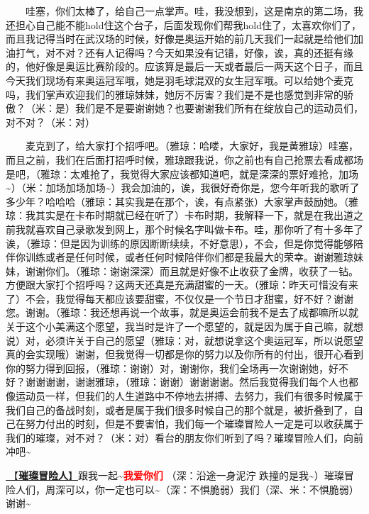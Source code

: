 \documentclass[]{ctexbook}
\begin{document}
  哇塞，你们太棒了，给自己一点掌声。哇，我没想到，这是南京的第二场，我还担心自己能不能hold住这个台子，后面发现你们帮我hold住了，太喜欢你们了，而且我记得当时在武汉场的时候，好像是奥运开始的前几天我们一起就是给他们加油打气，对不对？还有人记得吗？今天如果没有记错，好像，诶，真的还挺有缘的，他好像是奥运比赛阶段的。应该算是最后一天或者最后一两天这个日子，而且今天我们现场有来奥运冠军哦，她是羽毛球混双的女生冠军哦。可以给她个麦克吗，我们掌声欢迎我们的雅琼妹妹，她厉不厉害？我们是不是也感觉到非常的骄傲？（米：是）我们是不是要谢谢她？也要谢谢我们所有在绽放自己的运动员们，对不对？（米：对）

  麦克到了，给大家打个招呼吧。（雅琼：哈喽，大家好，我是黄雅琼）哇塞，而且之前，我们在后面打招呼时候，雅琼跟我说，你之前也有自己抢票去看成都场是吧，（雅琼：太难抢了，我觉得大家应该都知道吧，就是深深的票好难抢，加场\textasciitilde）（米：加场加场加场\textasciitilde）我会加油的，诶，我很好奇你是，您今年听我的歌听了多少年？哈哈哈（雅琼：其实我是在那个，诶，有点紧张）大家掌声鼓励她。（雅琼：我其实是在卡布时期就已经在听了）卡布时期，我解释一下，就是在我出道之前我就喜欢自己录歌发到网上，那个时候名字叫做卡布。哇，那你听了有十多年了诶，（雅琼：但是因为训练的原因断断续续，不好意思），不会，但是你觉得能够陪伴你训练或者是任何时候，或者任何时候陪伴你们都是我最大的荣幸。谢谢雅琼妹妹，谢谢你们。（雅琼：谢谢深深）而且就是好像不止收获了金牌，收获了一钻。方便跟大家打个招呼吗？这两天还真是充满甜蜜的一天。（雅琼：昨天可惜没有来了）不会，我觉得每天都应该要甜蜜，不仅仅是一个节日才甜蜜，好不好？谢谢您。谢谢。（雅琼：我还想再说一个故事，就是奥运会前我不是去了成都嘛所以就关于这个小美满这个愿望，我当时是许了一个愿望的，就是因为属于自己嘛，就想说）对，必须许关于自己的愿望（雅琼：对，就想说拿这个奥运冠军，所以说愿望真的会实现哦）谢谢，但我觉得一切都是你的努力以及你所有的付出，很开心看到你的努力得到回报，（雅琼：谢谢）对，谢谢你，我们全场再一次谢谢她，好不好？谢谢谢谢，谢谢雅琼，（雅琼：谢谢）谢谢谢谢。然后我觉得我们每个人也都像运动员一样，但我们的人生道路中不停地去拼搏、去努力，我们有很多时候属于我们自己的备战时刻，或者是属于我们很多时候自己的那个就是，被折叠到了，自己在努力付出的时刻，但是不要害怕，我们每一个璀璨冒险人一定是可以收获属于我们的璀璨，对不对？（米：对）看台的朋友你们听到了吗？璀璨冒险人们，向前冲吧\textasciitilde{}

\hyperref[adventurers]{🎵【\textbf{璀璨冒险人}】}跟我一起\textasciitilde{}\textbf{\textcolor{red}{我爱你们} }（深：沿途一身泥泞 跌撞的是我\textasciitilde）璀璨冒险人们，周深可以，你一定也可以\textasciitilde（深：不惧脆弱）我们（深、米：不惧脆弱）谢谢\textasciitilde{}
\end{document}
